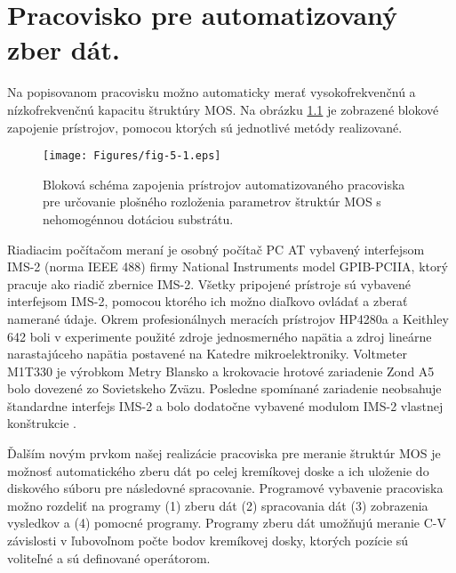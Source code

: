 
\chapter{Pracovisko pre automatizovaný zber dát.} %

\label{Chapter5} %


Na popisovanom pracovisku možno automaticky merať vysokofrekvenčnú a
nízkofrekvenčnú kapacitu štruktúry MOS. Na obrázku \ref{fig:5.1} je
zobrazené blokové zapojenie prístrojov, pomocou ktorých sú jednotlivé
metódy realizované.

\begin{figure}[h!]\centering
\texttt{[image: Figures/fig-5-1.eps]}
\captionsetup{justification=raggedright, singlelinecheck=false}
\caption[Bloková schéma zapojenia prístrojov automatizovaného
  pracoviska]{Bloková schéma zapojenia prístrojov automatizovaného
  pracoviska pre určovanie plošného rozloženia parametrov štruktúr MOS
  s nehomogénnou dotáciou substrátu.}
\label{fig:5.1}
\end{figure}

Riadiacim počítačom meraní je osobný počítač PC AT vybavený
interfejsom IMS-2 (norma IEEE 488) firmy National Instruments model
GPIB-PCIIA, ktorý pracuje ako riadič zbernice IMS-2. Všetky pripojené
prístroje sú vybavené interfejsom IMS-2, pomocou ktorého ich možno
diaľkovo ovládať a zberať namerané údaje. Okrem profesionálnych
meracích prístrojov HP4280a a Keithley 642 boli v experimente použité
zdroje jednosmerného napätia a zdroj lineárne narastajúceho napätia
postavené na Katedre mikroelektroniky. Voltmeter M1T330 je výrobkom
Metry Blansko a krokovacie hrotové zariadenie Zond A5 bolo dovezené zo
Sovietskeho Zväzu. Posledne spomínané zariadenie neobsahuje štandardne
interfejs IMS-2 a bolo dodatočne vybavené modulom IMS-2 vlastnej
konštrukcie \cite{5.1}.

Ďalším novým prvkom našej realizácie pracoviska pre meranie štruktúr
MOS je možnosť automatického zberu dát po celej kremíkovej doske a ich
uloženie do diskového súboru pre následovné spracovanie. Programové
vybavenie pracoviska možno rozdeliť na programy (1) zberu dát (2)
spracovania dát (3) zobrazenia vysledkov a (4) pomocné
programy. Programy zberu dát umožňujú meranie C-V závislosti v
ľubovoľnom počte bodov kremíkovej dosky, ktorých pozície sú voliteľné
a sú definované operátorom.

